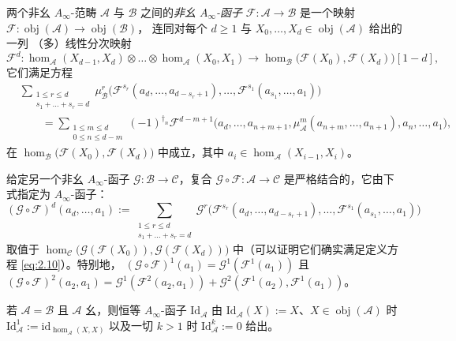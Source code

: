 \begin{Def}\label{def:2.7}
两个非幺 $A_\infty$-范畴 $\mathcal A$ 与 $\mathcal B$ 之间的\emph{非幺
$A_\infty$-函子} $\mathcal F:\mathcal A\to\mathcal B$ 是一个映射
$\mathcal F:\operatorname{obj}(\mathcal A)\to\operatorname{obj}(\mathcal B)$，
连同对每个 $d\ge 1$ 与 $X_0,\dots,X_d\in\operatorname{obj}(\mathcal A)$ 给出的一列
（多）线性分次映射
\begin{equation}\label{eq:2.9}
  \mathcal F^d:\hom_{\mathcal A}(X_{d-1},X_d)\otimes\dots\otimes
  \hom_{\mathcal A}(X_0,X_1)\longrightarrow
  \hom_{\mathcal B}\bigl(\mathcal F(X_0),\mathcal F(X_d)\bigr)[1-d],
\end{equation}
它们满足方程
\begin{equation}\label{eq:2.10}
  \begin{aligned}
    &\sum_{\substack{1\le r\le d\\ s_1+\dots+s_r=d}}
    \mu^r_{\mathcal B}\bigl(\mathcal F^{s_r}(a_d,\dots,a_{d-s_r+1}),\dots,
    \mathcal F^{s_1}(a_{s_1},\dots,a_1)\bigr)\\
    &\qquad=\sum_{\substack{1\le m\le d\\ 0\le n\le d-m}}(-1)^{\dagger_n}
    \mathcal F^{d-m+1}\bigl(a_d,\dots,a_{n+m+1},
    \mu^m_{\mathcal A}(a_{n+m},\dots,a_{n+1}),a_n,\dots,a_1\bigr),
  \end{aligned}
\end{equation}
在 $\hom_{\mathcal B}\bigl(\mathcal F(X_0),\mathcal F(X_d)\bigr)$ 中成立，其中
$a_i\in\hom_{\mathcal A}(X_{i-1},X_i)$。
\end{Def}

给定另一个非幺 $A_\infty$-函子 $\mathcal G:\mathcal B\to\mathcal C$，复合
$\mathcal G\circ\mathcal F:\mathcal A\to\mathcal C$ 是严格结合的，它由下式指定为
$A_\infty$-函子：
\begin{equation}\label{eq:2.11}
  (\mathcal G\circ\mathcal F)^d(a_d,\dots,a_1):=
  \sum_{\substack{1\le r\le d\\ s_1+\dots+s_r=d}}
  \mathcal G^r\bigl(\mathcal F^{s_r}(a_d,\dots,a_{d-s_r+1}),\dots,
  \mathcal F^{s_1}(a_{s_1},\dots,a_1)\bigr)
\end{equation}
取值于 $\hom_{\mathcal C}\bigl(\mathcal G(\mathcal F(X_0)),\mathcal G(\mathcal
F(X_d))\bigr)$ 中（可以证明它们确实满足定义方程 \eqref{eq:2.10}）。特别地，
$(\mathcal G\circ\mathcal F)^1(a_1)=\mathcal G^1(\mathcal F^1(a_1))$ 且
$(\mathcal G\circ\mathcal F)^2(a_2,a_1)=\mathcal G^1(\mathcal F^2(a_2,a_1))
+\mathcal G^2(\mathcal F^1(a_2),\mathcal F^1(a_1))$。

若 $\mathcal A=\mathcal B$ 且 $\mathcal A$ 幺，则恒等 $A_\infty$-函子
$\mathrm{Id}_{\mathcal A}$ 由 $\mathrm{Id}_{\mathcal A}(X):=X$、$X\in
\operatorname{obj}(\mathcal A)$ 时 $\mathrm{Id}^1_{\mathcal A}:=
\mathrm{id}_{\hom_{\mathcal A}(X,X)}$ 以及一切 $k>1$ 时
$\mathrm{Id}^k_{\mathcal A}:=0$ 给出。

